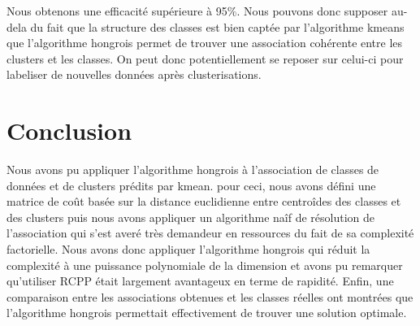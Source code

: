 \documentclass[
]{article}
\begin{document}
Nous obtenons une efficacité supérieure à 95\%. Nous pouvons donc
supposer au-dela du fait que la structure des classes est bien captée
par l'algorithme kmeans que l'algorithme hongrois permet de trouver une
association cohérente entre les clusters et les classes. On peut donc
potentiellement se reposer sur celui-ci pour labeliser de nouvelles
données après clusterisations.

\hypertarget{conclusion}{%
\section{Conclusion}\label{conclusion}}

Nous avons pu appliquer l'algorithme hongrois à l'association de classes
de données et de clusters prédits par kmean. pour ceci, nous avons
défini une matrice de coût basée sur la distance euclidienne entre
centroîdes des classes et des clusters puis nous avons appliquer un
algorithme naîf de résolution de l'association qui s'est averé très
demandeur en ressources du fait de sa complexité factorielle. Nous avons
donc appliquer l'algorithme hongrois qui réduit la complexité à une
puissance polynomiale de la dimension et avons pu remarquer qu'utiliser
RCPP était largement avantageux en terme de rapidité. Enfin, une
comparaison entre les associations obtenues et les classes réelles ont
montrées que l'algorithme hongrois permettait effectivement de trouver
une solution optimale.
\end{document}
